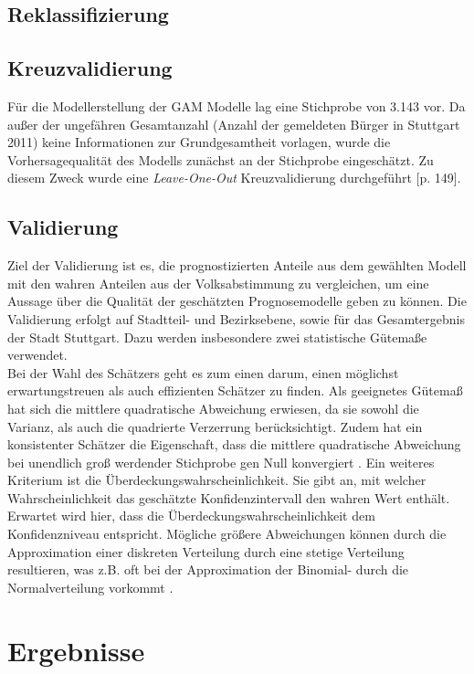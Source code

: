 \documentclass{Vorlage}
\begin{document}
\subsection{Reklassifizierung}


\subsection{Kreuzvalidierung}
Für die Modellerstellung der GAM Modelle lag eine Stichprobe von 3.143 vor. Da außer der ungefähren Gesamtanzahl 
(Anzahl der gemeldeten Bürger in Stuttgart 2011) keine Informationen zur Grundgesamtheit vorlagen, wurde die 
Vorhersagequalität des Modells zunächst an der Stichprobe eingeschätzt. Zu diesem Zweck wurde eine 
\textit{Leave-One-Out} Kreuzvalidierung durchgeführt \cite{fahrmeir2013regression}[p. 149].

\subsection{Validierung}

Ziel der Validierung ist es, die prognostizierten Anteile aus dem gewählten Modell mit den wahren Anteilen aus der Volksabstimmung \cite{Amt} zu vergleichen, um eine Aussage über die Qualität der geschätzten Prognosemodelle geben zu können. Die Validierung erfolgt auf Stadtteil- und Bezirksebene, sowie für das Gesamtergebnis der Stadt Stuttgart. Dazu werden insbesondere zwei statistische Gütemaße verwendet.\\
Bei der Wahl des Schätzers geht es zum einen darum, einen möglichst erwartungstreuen als auch effizienten Schätzer zu finden. Als geeignetes Gütemaß hat sich die mittlere quadratische Abweichung erwiesen, da sie sowohl die Varianz, als auch die quadrierte Verzerrung berücksichtigt. Zudem hat ein konsistenter Schätzer die Eigenschaft, dass die mittlere quadratische Abweichung bei unendlich groß werdender Stichprobe gen Null konvergiert \cite[p. 201]{HOG}. Ein weiteres Kriterium ist die Überdeckungswahrscheinlichkeit. Sie gibt an, mit welcher Wahrscheinlichkeit das geschätzte Konfidenzintervall den wahren Wert enthält. Erwartet wird hier, dass die Überdeckungswahrscheinlichkeit dem Konfidenzniveau entspricht. Mögliche größere Abweichungen können durch die Approximation einer diskreten Verteilung durch eine stetige Verteilung resultieren, was z.B. oft bei der Approximation der Binomial- durch die Normalverteilung vorkommt \cite[p. 102]{Int}.  

\section{Ergebnisse}
\end{document}
